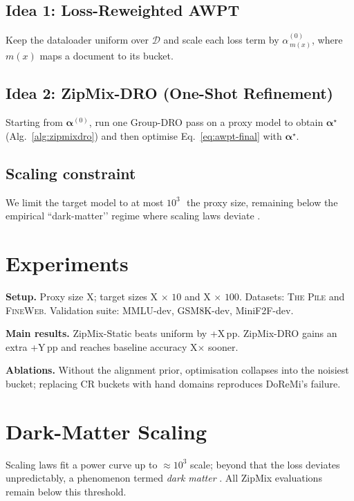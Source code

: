 \documentclass{article}
\begin{document}
\subsection{Idea 1: Loss-Reweighted AWPT}
Keep the dataloader uniform over $\mathcal{D}$ and scale each loss term by
$\alpha^{(0)}_{\,m(x)}$, where $m(x)$ maps a document to its bucket.

\subsection{Idea 2: ZipMix-DRO (One-Shot Refinement)}
Starting from $\boldsymbol{\alpha}^{(0)}$, run one Group-DRO pass on a
proxy model to obtain $\boldsymbol{\alpha}^{\star}$
(Alg.~\ref{alg:zipmixdro}) and then optimise
Eq.~\eqref{eq:awpt-final} with $\boldsymbol{\alpha}^{\star}$.

\subsection{Scaling constraint}\label{sec:scaling}
We limit the target model to at most
$10^{3}$\,\texttimes\ the proxy size, remaining below the empirical
“dark-matter’’ regime where scaling laws deviate
\citep{gpt4report,schaeffer2025darkmatter}.


\section{Experiments}\label{sec:experiments}
\textbf{Setup.}
Proxy size X; target sizes X$\,\times\,10$ and X$\,\times\,100$.
Datasets: \textsc{The Pile} and \textsc{FineWeb}.
Validation suite: MMLU-dev, GSM8K-dev, MiniF2F-dev.

\textbf{Main results.}
ZipMix-Static beats uniform by +X\,pp.
ZipMix-DRO gains an extra +Y\,pp and reaches baseline accuracy
X$\times$ sooner.

\textbf{Ablations.}
Without the alignment prior, optimisation collapses into the noisiest
bucket; replacing CR buckets with hand domains reproduces DoReMi’s failure.

\section{Dark-Matter Scaling}\label{sec:darkmatter}
Scaling laws fit a power curve up to $\approx10^{3}$ scale; beyond that the
loss deviates unpredictably, a phenomenon termed \emph{dark matter}
\citep{schaeffer2025darkmatter}.  All ZipMix evaluations remain below this
threshold.
\end{document}
